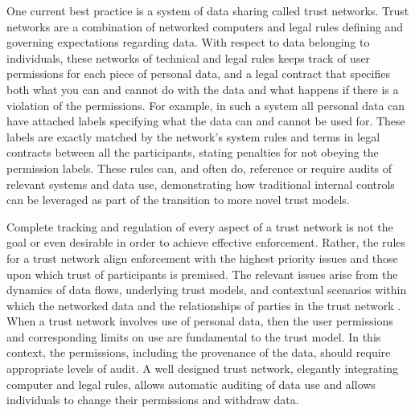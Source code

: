 One current best practice is a system of data sharing called trust networks.
Trust networks are a combination of networked computers and legal rules defining and governing expectations regarding data.
With respect to data belonging to individuals, these networks of technical and legal rules keeps track of user permissions for each piece of personal data, and a legal contract that specifies both what you can and cannot do with the data and what happens if there is a violation of the permissions.
For example, in such a system all personal data can have attached labels specifying what the data can and cannot be used for.
These labels are exactly matched by the network's system rules and terms in legal contracts between all the participants, stating penalties for not obeying the permission labels.
These rules can, and often do, reference or require audits of relevant systems and data use, demonstrating how traditional internal controls can be leveraged as part of the transition to more novel trust models.

Complete tracking and regulation of every aspect of a trust network is not the goal or even desirable in order to achieve effective enforcement.
Rather, the rules for a trust network align enforcement with the highest priority issues and those upon which trust of participants is premised.
The relevant issues arise from the dynamics of data flows, underlying trust models, and contextual scenarios within which the networked data and the relationships of parties in the trust network . 
When a trust network involves use of personal data, then the user permissions and corresponding limits on use are fundamental to the trust model.
In this context, the permissions, including the provenance of the data, should require appropriate levels of audit.
A well designed trust network, elegantly integrating computer and legal rules, allows automatic auditing of data use and allows individuals to change their permissions and withdraw data.

